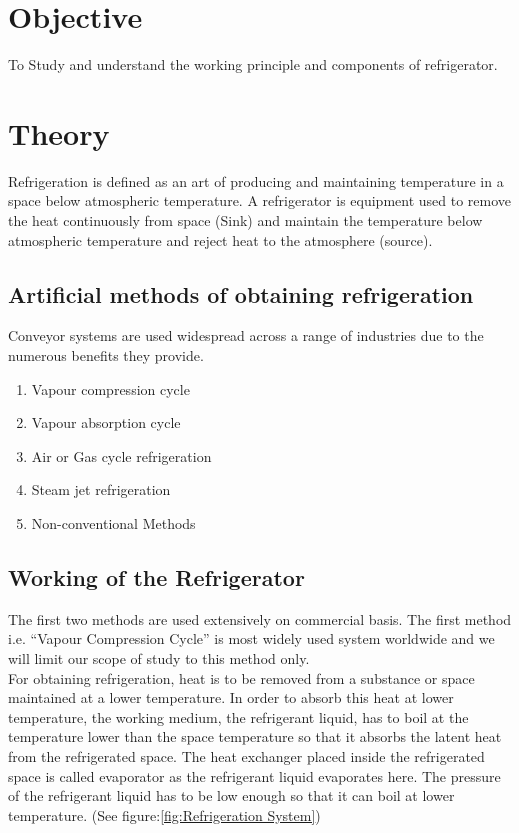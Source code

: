 \documentclass[11pt]{article}
\begin{document}
	
\tableofcontents
\thispagestyle{empty}
\clearpage
\setcounter{page}{1}

\section{Objective}
To Study and understand the working principle and components of refrigerator.


\section{Theory}

Refrigeration is defined as an art of producing and maintaining temperature in a space below atmospheric temperature. A refrigerator is equipment used to remove the heat continuously from space (Sink) and maintain the temperature below atmospheric temperature and reject heat to the atmosphere (source).

\subsection{Artificial methods of obtaining refrigeration}

Conveyor systems are used widespread across a range of industries due to the numerous benefits they provide.


\begin{enumerate}
	\item Vapour compression cycle
	\item Vapour absorption cycle
	\item Air or Gas cycle refrigeration
	\item Steam jet refrigeration
	\item Non-conventional Methods
\end{enumerate}

\subsection{Working of the Refrigerator}

The first two methods are used extensively on commercial basis. The first method i.e. “Vapour Compression Cycle” is most widely used system worldwide and we will limit our scope of study to this method only.\\


For obtaining refrigeration, heat is to be removed from a substance or space maintained at a lower temperature. In order to absorb this heat at lower temperature, the working medium, the refrigerant liquid, has to boil at the temperature lower than the space temperature so that it absorbs the latent heat from the refrigerated space. The heat exchanger placed inside the refrigerated space is called evaporator as the refrigerant liquid evaporates here. The pressure of the refrigerant liquid has to be low enough so that it can boil at lower temperature.  
(See figure:\ref{fig:Refrigeration System})\\
\end{document}
